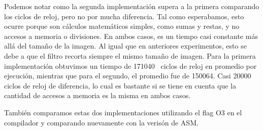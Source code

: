 \documentclass[a4paper]{article}
\begin{document}
\begin{centering}
\end{centering}

Podemos notar como la segunda implementación supera a la primera comparando los ciclos de reloj, pero no por mucha diferencia. Tal como esperabamos,
esto ocurre porque son cálculos matemáticos simples, como sumas y restas, y no accesos a memoria o divisiones.
En ambos casos, es un tiempo casi constante más allá del tamaño de la imagen. Al igual que en anteriores experimentos, esto se debe a que el filtro
recorta siempre el mismo tamaño de imagen. Para la primera implementación obtuvimos un tiempo de 171040~ ciclos de reloj en promedio por ejecución, mientras
que para el segundo, el promedio fue de 150064. Casi 20000 ciclos de reloj de diferencia, lo cual es bastante si se tiene en cuenta que la cantidad de
accesos a memoria es la misma en ambos casos.

También comparamos estas dos implementaciones utilizando el flag O3 en el compilador y comparando nuevamente con la verisón de ASM.
\end{document}
